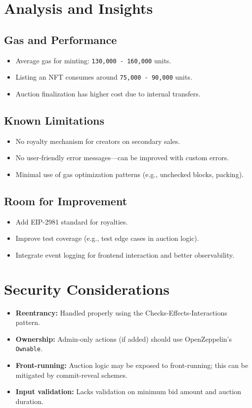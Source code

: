 \documentclass{article}
\begin{document}
\section*{Analysis and Insights}
\subsection*{Gas and Performance}
\begin{itemize}
  \item Average gas for minting: \texttt{130,000 - 160,000} units.
  \item Listing an NFT consumes around \texttt{75,000 - 90,000} units.
  \item Auction finalization has higher cost due to internal transfers.
\end{itemize}

\subsection*{Known Limitations}
\begin{itemize}
  \item No royalty mechanism for creators on secondary sales.
  \item No user-friendly error messages—can be improved with custom errors.
  \item Minimal use of gas optimization patterns (e.g., unchecked blocks, packing).
\end{itemize}

\subsection*{Room for Improvement}
\begin{itemize}
  \item Add EIP-2981 standard for royalties.
  \item Improve test coverage (e.g., test edge cases in auction logic).
  \item Integrate event logging for frontend interaction and better observability.
\end{itemize}

\section*{Security Considerations}
\begin{itemize}
  \item \textbf{Reentrancy:} Handled properly using the Checks-Effects-Interactions pattern.
  \item \textbf{Ownership:} Admin-only actions (if added) should use OpenZeppelin's \texttt{Ownable}.
  \item \textbf{Front-running:} Auction logic may be exposed to front-running; this can be mitigated by commit-reveal schemes.
  \item \textbf{Input validation:} Lacks validation on minimum bid amount and auction duration.
\end{itemize}
\end{document}
